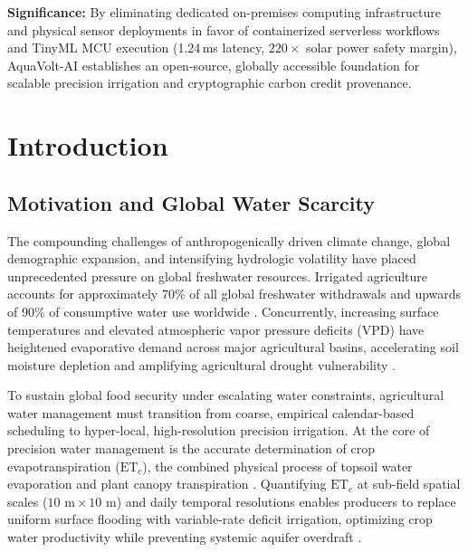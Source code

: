 \documentclass[sn-mathphys-num,Numbered]{sn-jnl}
\begin{document}
{\textbf{Significance:} By eliminating dedicated on-premises computing infrastructure and physical sensor deployments in favor of containerized serverless workflows and TinyML MCU execution (1.24\,ms latency, $220\times$ solar power safety margin), AquaVolt-AI establishes an open-source, globally accessible foundation for scalable precision irrigation and cryptographic carbon credit provenance.
}


\maketitle

\section{Introduction}\label{sec:intro}

\subsection{Motivation and Global Water Scarcity}\label{sec:intro_motivation}
The compounding challenges of anthropogenically driven climate change, global demographic expansion, and intensifying hydrologic volatility have placed unprecedented pressure on global freshwater resources. Irrigated agriculture accounts for approximately 70\% of all global freshwater withdrawals and upwards of 90\% of consumptive water use worldwide \cite{MunozSabater2021,Friedlingstein2023}. Concurrently, increasing surface temperatures and elevated atmospheric vapor pressure deficits (VPD) have heightened evaporative demand across major agricultural basins, accelerating soil moisture depletion and amplifying agricultural drought vulnerability \cite{Jiao2021,Hassani2021}. 

To sustain global food security under escalating water constraints, agricultural water management must transition from coarse, empirical calendar-based scheduling to hyper-local, high-resolution precision irrigation. At the core of precision water management is the accurate determination of crop evapotranspiration ($\mathrm{ET}_c$), the combined physical process of topsoil water evaporation and plant canopy transpiration \cite{Allen1998,Penman1948,Monteith1965}. Quantifying $\mathrm{ET}_c$ at sub-field spatial scales ($10\text{ m} \times 10\text{ m}$) and daily temporal resolutions enables producers to replace uniform surface flooding with variable-rate deficit irrigation, optimizing crop water productivity while preventing systemic aquifer overdraft \cite{Gowda2008}.
\end{document}
